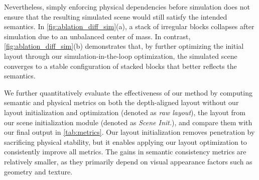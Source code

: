 Nevertheless, simply enforcing physical dependencies before simulation does not ensure that the resulting simulated scene would still satisfy the intended semantics. In \autoref{fig:ablation_diff_sim}(a), a stack of irregular blocks collapses after simulation due to an unbalanced center of mass. In contrast, \autoref{fig:ablation_diff_sim}(b) demonstrates that, by further optimizing the initial layout through our simulation-in-the-loop optimization, the simulated scene converges to a stable configuration of stacked blocks that better reflects the semantics.

We further quantitatively evaluate the effectiveness of our method by computing semantic and physical metrics on both the depth-aligned layout without our layout initialization and optimization (denoted as \textit{raw layout}), the layout from our scene initialization module (denoted as \textit{{Scene Init.}}), and compare them with our final output in \autoref{tab:metrics}. Our layout initialization removes penetration by sacrificing physical stability, but it enables applying our layout optimization to consistently improve all metrics.  The gains in semantic consistency metrics are relatively smaller, as they primarily depend on visual appearance factors such as geometry and texture.










